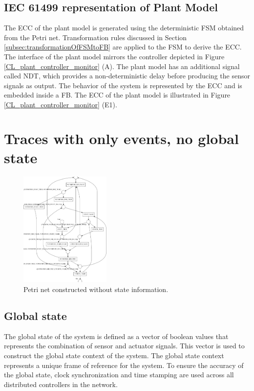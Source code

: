 \begin{bibunit}
\subsection{IEC 61499 representation of Plant Model}



The ECC of the plant model is generated using the deterministic FSM obtained from the Petri net. Transformation rules discussed in Section \ref{subsec:transformationOfFSMtoFB} are applied to the FSM to derive the ECC. The interface of the plant model mirrors the controller depicted in  Figure \ref{CL_plant_controller_monitor} (A). The plant model has an additional signal called NDT, which provides a non-deterministic delay before producing the sensor signals as output. The behavior of the system is represented by the ECC and is embedded inside a FB. The ECC of the plant model is illustrated in Figure  \ref{CL_plant_controller_monitor} (E1).


\section{Traces with only events, no global state}

\begin{figure}[!t]
	\centering
	\includegraphics[width=0.4\textwidth]{MX_Papers/Paper7/images/StatelessPN.PNG}
	\caption{Petri net constructed without state information.}
	\label{StatelessPN}
\end{figure}

\subsection{Global state}


The global state of the system is defined as a vector of boolean values that represents the combination of sensor and actuator signals. This vector is used to construct the global state context of the system. The global state context represents a unique frame of reference for the system. To ensure the accuracy of the global state, clock synchronization and time stamping are used across all distributed controllers in the network.



\end{bibunit}
